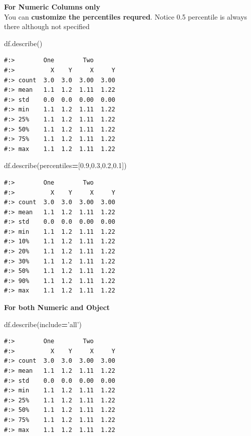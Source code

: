 \documentclass[
]{book}
\newenvironment{Shaded}{\begin{snugshade}}{\end{snugshade}}
\newcommand{\FloatTok}[1]{\textcolor[rgb]{0.06,0.06,0.06}{#1}}
\newcommand{\NormalTok}[1]{#1}
\newcommand{\OperatorTok}[1]{\textcolor[rgb]{0.43,0.43,0.43}{\textbf{#1}}}
\newcommand{\StringTok}[1]{\textcolor[rgb]{0.5,0.5,0.5}{#1}}
\begin{document}
\textbf{For Numeric Columns only}\\
You can \textbf{customize the percentiles requred}. Notice 0.5 percentile is always there although not specified

\begin{Shaded}
\begin{Highlighting}[]
\NormalTok{df.describe()}
\end{Highlighting}
\end{Shaded}

\begin{verbatim}
#:>        One        Two      
#:>          X    Y     X     Y
#:> count  3.0  3.0  3.00  3.00
#:> mean   1.1  1.2  1.11  1.22
#:> std    0.0  0.0  0.00  0.00
#:> min    1.1  1.2  1.11  1.22
#:> 25%    1.1  1.2  1.11  1.22
#:> 50%    1.1  1.2  1.11  1.22
#:> 75%    1.1  1.2  1.11  1.22
#:> max    1.1  1.2  1.11  1.22
\end{verbatim}

\begin{Shaded}
\begin{Highlighting}[]
\NormalTok{df.describe(percentiles}\OperatorTok{=}\NormalTok{[}\FloatTok{0.9}\NormalTok{,}\FloatTok{0.3}\NormalTok{,}\FloatTok{0.2}\NormalTok{,}\FloatTok{0.1}\NormalTok{])}
\end{Highlighting}
\end{Shaded}

\begin{verbatim}
#:>        One        Two      
#:>          X    Y     X     Y
#:> count  3.0  3.0  3.00  3.00
#:> mean   1.1  1.2  1.11  1.22
#:> std    0.0  0.0  0.00  0.00
#:> min    1.1  1.2  1.11  1.22
#:> 10%    1.1  1.2  1.11  1.22
#:> 20%    1.1  1.2  1.11  1.22
#:> 30%    1.1  1.2  1.11  1.22
#:> 50%    1.1  1.2  1.11  1.22
#:> 90%    1.1  1.2  1.11  1.22
#:> max    1.1  1.2  1.11  1.22
\end{verbatim}

\textbf{For both Numeric and Object}

\begin{Shaded}
\begin{Highlighting}[]
\NormalTok{df.describe(include}\OperatorTok{=}\StringTok{'all'}\NormalTok{)}
\end{Highlighting}
\end{Shaded}

\begin{verbatim}
#:>        One        Two      
#:>          X    Y     X     Y
#:> count  3.0  3.0  3.00  3.00
#:> mean   1.1  1.2  1.11  1.22
#:> std    0.0  0.0  0.00  0.00
#:> min    1.1  1.2  1.11  1.22
#:> 25%    1.1  1.2  1.11  1.22
#:> 50%    1.1  1.2  1.11  1.22
#:> 75%    1.1  1.2  1.11  1.22
#:> max    1.1  1.2  1.11  1.22
\end{verbatim}
\end{document}
